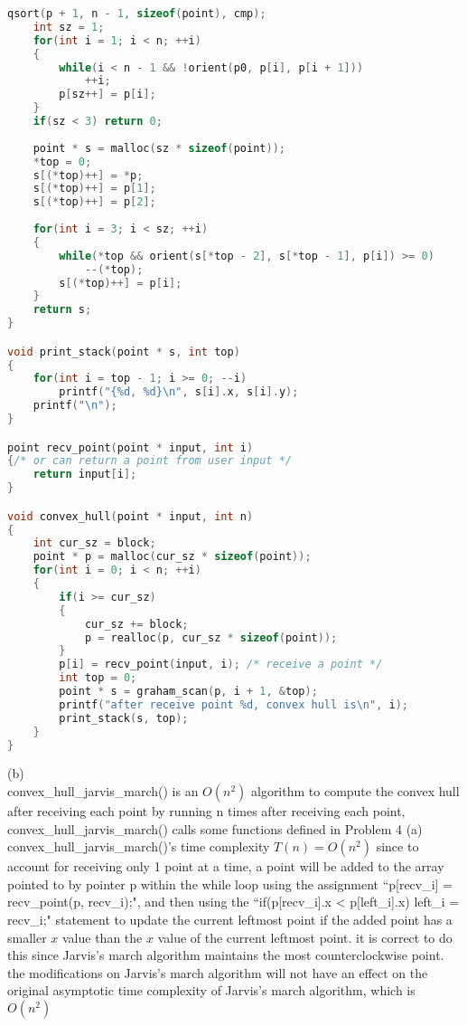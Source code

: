 \documentclass[12pt,border=4pt,multi]{article} %
\begin{document}
\begin{lstlisting}[language = c]
    qsort(p + 1, n - 1, sizeof(point), cmp);
    int sz = 1;
    for(int i = 1; i < n; ++i)
    {
        while(i < n - 1 && !orient(p0, p[i], p[i + 1]))
            ++i;
        p[sz++] = p[i];
    }
    if(sz < 3) return 0;
    
    point * s = malloc(sz * sizeof(point));
    *top = 0;
    s[(*top)++] = *p;
    s[(*top)++] = p[1];
    s[(*top)++] = p[2];
    
    for(int i = 3; i < sz; ++i)
    {
        while(*top && orient(s[*top - 2], s[*top - 1], p[i]) >= 0)
            --(*top);
        s[(*top)++] = p[i];
    }
    return s;
}

void print_stack(point * s, int top)
{
    for(int i = top - 1; i >= 0; --i)
        printf("{%d, %d}\n", s[i].x, s[i].y);
    printf("\n");
}

point recv_point(point * input, int i)
{/* or can return a point from user input */
    return input[i];
}

void convex_hull(point * input, int n)
{
    int cur_sz = block;
    point * p = malloc(cur_sz * sizeof(point));
    for(int i = 0; i < n; ++i)
    {
        if(i >= cur_sz)
        {
            cur_sz += block;
            p = realloc(p, cur_sz * sizeof(point));
        }
        p[i] = recv_point(input, i); /* receive a point */
        int top = 0;
        point * s = graham_scan(p, i + 1, &top);
        printf("after receive point %d, convex hull is\n", i);
        print_stack(s, top);
    }
}
\end{lstlisting}
\newpage
\noindent
(b)\\
convex\_hull\_jarvis\_march() is an $O(n^2)$ algorithm
to compute the convex hull 
after receiving each point
by running n times 
after receiving each point, convex\_hull\_jarvis\_march() calls some functions defined in Problem 4 (a)\\
convex\_hull\_jarvis\_march()'s time complexity $T(n) = O(n^2)$ since to account for receiving only 1 point at a time, a point will be added to the array pointed to by pointer p within the while loop using the assignment ``p[recv\_i] = recv\_point(p, recv\_i);", and then using the         ``if(p[recv\_i].x < p[left\_i].x) left\_i = recv\_i;" statement to update the current leftmost point if the added point has a smaller $x$ value than the $x$ value of the current leftmost point. it is correct to do this since Jarvis's march algorithm maintains the most counterclockwise point. the modifications on Jarvis's march algorithm will not have an effect on the original asymptotic time complexity of Jarvis's march algorithm, which is $O(n^2)$\\
\end{document}
